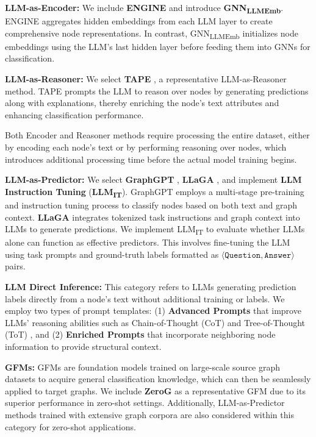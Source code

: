 \textbf{LLM-as-Encoder: }We include \textbf{ENGINE} \cite{Zhu2024ENGINE} and introduce \textbf{GNN\textsubscript{LLMEmb}}. ENGINE aggregates hidden embeddings from each LLM layer to create comprehensive node representations. In contrast, GNN\textsubscript{LLMEmb} initializes node embeddings using the LLM's last hidden layer before feeding them into GNNs for classification.

\textbf{LLM-as-Reasoner: }We select \textbf{TAPE} \cite{he2023TAPE}, a representative LLM-as-Reasoner method. TAPE prompts the LLM to reason over nodes by generating predictions along with explanations, thereby enriching the node's text attributes and enhancing classification performance.

Both Encoder and Reasoner methods require processing the entire dataset, either by encoding each node's text or by performing reasoning over nodes, which introduces additional processing time before the actual model training begins.

\textbf{LLM-as-Predictor: }We select \textbf{GraphGPT} \cite{tang2023graphgpt}, \textbf{LLaGA} \cite{chen23llaga}, and implement \textbf{LLM Instruction Tuning} (\textbf{LLM\textsubscript{IT}}). GraphGPT employs a multi-stage pre-training and instruction tuning process to classify nodes based on both text and graph context. \textbf{LLaGA} integrates tokenized task instructions and graph context into LLMs to generate predictions.  We implement LLM\textsubscript{IT} to evaluate whether LLMs alone can function as effective predictors. This involves fine-tuning the LLM using task prompts and ground-truth labels formatted as $\langle \texttt{Question}, \texttt{Answer} \rangle$ pairs. 

\textbf{LLM Direct Inference: } This category refers to LLMs generating prediction labels directly from a node's text without additional training or labels. We employ two types of prompt templates: (1) \textbf{Advanced Prompts} that improve LLMs' reasoning abilities such as Chain-of-Thought (CoT) \cite{Wei2022ChainOT} and Tree-of-Thought (ToT) \cite{yao2023tree}, and (2) \textbf{Enriched Prompts} that incorporate neighboring node information to provide structural context.


\textbf{GFMs: } GFMs are foundation models trained on large-scale source graph datasets to acquire general classification knowledge, which can then be seamlessly applied to target graphs. We include \textbf{ZeroG} \cite{li2024zerog} as a representative GFM due to its superior performance in zero-shot settings. Additionally, LLM-as-Predictor methods trained with extensive graph corpora are also considered within this category for zero-shot applications.

